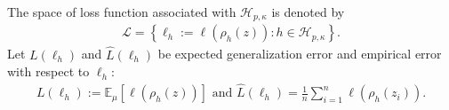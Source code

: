 \documentclass{article}
\begin{document}
The space of loss function associated with $\mathcal{H}_{p,\kappa}$  is denoted by
\begin{align}
\label{eq-sapce-loss-functions}
  \mathcal{L}=\left\{\ell_h:=\ell(\rho_h(z)):h\in\mathcal{H}_{p,\kappa}\right\}.
\end{align}
Let $L(\ell_h)$ and  $\hat{L}(\ell_h)$ be expected generalization error and
 empirical error  with respect to $\ell_h$:
\begin{align*}
  L(\ell_h):=\mathbb{E}_\mu[\ell(\rho_h(z))] \text{ and } \hat{L}(\ell_h)=\frac{1}{n}\sum_{i=1}^n\ell(\rho_h(z_i)).
\end{align*}




\end{document}
